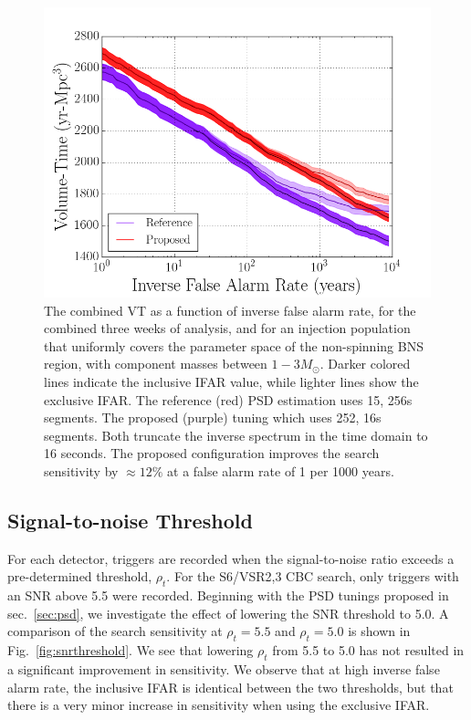 \begin{figure}
\centering
\includegraphics[width=1.0\textwidth]{papers/bns_o1_dev/figures/psd_combined.png}
\caption{\label{fig:psd} 
The combined VT as a function of inverse false alarm rate, for the combined three weeks of analysis, and for an injection population that uniformly covers the parameter space of the non-spinning BNS region, with component masses between $1- 3M_\odot$. Darker colored lines indicate the inclusive IFAR value, while lighter lines show the exclusive IFAR. The reference (red) PSD estimation uses 15, 256s segments. The proposed (purple) tuning which uses 252, 16s segments. Both truncate the inverse spectrum in the time domain to 16 seconds. The proposed configuration improves the search sensitivity by $\approx 12\% $ at a false alarm rate of 1 per 1000 years.
}
\end{figure}

\subsection{Signal-to-noise Threshold}
\label{sec:snr}

For each detector, triggers are recorded when the signal-to-noise ratio exceeds a pre-determined threshold, $\rho_t$. For the S6/VSR2,3 CBC search, only triggers with an SNR above 5.5 were recorded. Beginning with the PSD tunings proposed in sec.~\ref{sec:psd}, we investigate the effect of lowering the SNR threshold to 5.0. A comparison of the search sensitivity at $\rho_t=5.5$ and $\rho_t=5.0$ is shown in Fig.~\ref{fig:snrthreshold}. We see that lowering $\rho_t$ from 5.5 to 5.0 has not resulted in a significant improvement in sensitivity. We observe that at high inverse false alarm rate, the inclusive IFAR is identical between the two thresholds, but that there is a very minor increase in sensitivity when using the exclusive IFAR.

